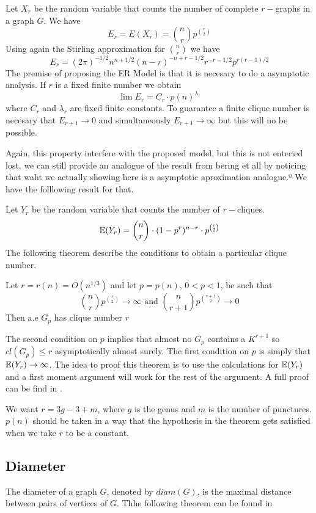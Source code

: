 Let $X_r$ be the random variable that counts the number of complete $r-$graphs in a graph $G$. We have
$$E_{r} = E(X_r) = \binom{n}{r}p^{\binom{r}{2}}$$
Using again the Stirling approximation for $\binom{n}{r}$ we have
$$E_{r} = (2\pi)^{- 1/2} n^{n+ 1/2} (n - r)^{-n+r-1/2} r^{-r-1/2} p^{r(r- 1)/2}$$
The premise of proposing the ER Model is that it is necesary to do a asymptotic analysis. If $r$ is a fixed finite number we obtain
$$\lim E_{r} = C_{r} \cdot p(n)^{\lambda_{r}}$$
where $C_{r}$ and $\lambda_{r}$ are fixed finite constants. To guarantee a finite clique number is necesary that $E_{r+1} \to 0$ and simultaneously $E_{r+1} \to \infty$ but this will no be possible.

Again, this property interfere with the proposed model, but this is not enteried lost, we can still provide an analogue of the result from bering et all by noticing that waht we actually showing here is a asymptotic aproximation analogue.º
We have the folllowing result for that.

Let $Y_{r}$ be the random variable that counts the number of $r-$cliques.
$$\mathbb{E}(Y_{r}) = \binom{n}{r} \cdot (1-p^{r})^{n-r} \cdot p^{\binom{r}{2}}  $$
The following theorem describe the conditions to obtain a particular clique number.

\begin{theorem}
Let $r = r(n) = O(n^{1/3})$ and let $p=p(n)$, $0<p<1$, be such that
$$\binom{n}{r} p^{\binom{r}{2}} \to \infty \text{ and } \binom{n}{r+1} p^{\binom{r+1}{2}} \to 0 $$
Then a.e $G_{p}$ has clique number $r$
\end{theorem}
The second condition on $p$ implies that almost no $G_{p}$ contains a $K^{r+1}$ so $cl(G_{p})\leq r$ asymptotically almost surely. The first condition on $p$ is simply that $\mathbb{E} (Y_{r}) \to  \infty$. The idea to proof this theorem is to use the calculations for $\mathbb{E}(Y_{r})$ and a first moment argument will work for the rest of the argument. A full proof can be find in \cite[Bollobás, p.290]{Bollobas}.

We want $r = 3g-3+m$, where $g$ is the genus and $m$ is the number of punctures. $p(n)$ should be taken in a way that the hypothesis in the theorem gets satisfied when we take $r$ to be a constant.


\subsection{Diameter}

The diameter of a graph $G$, denoted by $diam(G)$, is the maximal distance between pairs of vertices of $G$. Thhe following theorem can be found in \cite[Bollobás, p.259]{Bollobas}




